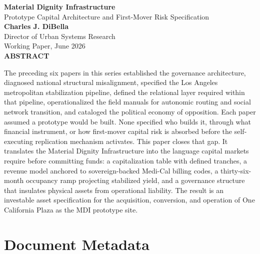 \documentclass[12pt, letterpaper]{article}
\begin{document}
\captionsetup[table]{labelfont=normalfont, labelsep=period, skip=6pt}

\begin{titlepage}
\begin{center}
{\LARGE \textbf{Material Dignity Infrastructure}}\\[6pt]
{\large Prototype Capital Architecture and First-Mover Risk Specification}\\[0.5cm]
{\normalsize \textbf{Charles J. DiBella}}\\[0.01cm]
{\normalsize Director of Urban Systems Research}\\[0.01cm]
{\normalsize Working Paper, June 2026}\\[0.3cm]
\textbf{ABSTRACT}
\vspace{0.2cm}
\end{center}
\begin{minipage}{0.95\textwidth}
\noindent

The preceding six papers in this series established the governance architecture, diagnosed national structural misalignment, specified the Los Angeles metropolitan stabilization pipeline, defined the relational layer required within that pipeline, operationalized the field manuals for autonomic routing and social network transition, and cataloged the political economy of opposition. Each paper assumed a prototype would be built. None specified who builds it, through what financial instrument, or how first-mover capital risk is absorbed before the self-executing replication mechanism activates. This paper closes that gap. It translates the Material Dignity Infrastructure into the language capital markets require before committing funds: a capitalization table with defined tranches, a revenue model anchored to sovereign-backed Medi-Cal billing codes, a thirty-six-month occupancy ramp projecting stabilized yield, and a governance structure that insulates physical assets from operational liability. The result is an investable asset specification for the acquisition, conversion, and operation of One California Plaza as the MDI prototype site.

\end{minipage}
\end{titlepage}


\newpage
\section*{Document Metadata}
\end{document}
